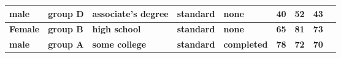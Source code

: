 \documentclass{article}
\begin{document}
\begin{table}[h!]
\begin{center}
\begin{tabular}{|l|m{1.4cm}|m{1.8cm}|c|m{1.6cm}|c|m{1.3cm}|m{1.5cm}|m{1.5cm}|}
	  	\hline 
	  	\textbf{male} & \textbf{group D} & \textbf{associate's degree} & \textbf{standard} & \textbf{none} & \textbf{40} & \textbf{52} & \textbf{43}\\ 
	  	\hline
	  	\textbf{Female} & \textbf{group B} & \textbf{high school} & \textbf{standard} & \textbf{none} & \textbf{65} & \textbf{81} & \textbf{73}\\ 
	  	\hline 
	  	\textbf{male} & \textbf{group A} & \textbf{some college} & \textbf{standard} & \textbf{completed} & \textbf{78} & \textbf{72} & \textbf{70}\\ 
	  	\hline
	   \end{tabular} 	 
	\end{center}
\end{table}	
\end{document}
